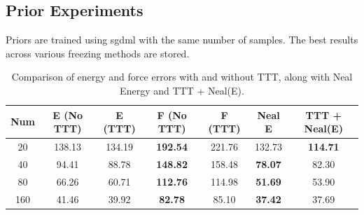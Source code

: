 \documentclass[12pt]{article}
\theoremstyle{definition}
\theoremstyle{remark}
\begin{document}
\subsection{Prior Experiments}
Priors are trained using sgdml with the same number of samples. The best results across various freezing methods are stored.
\begin{table}[ht]
\centering
\small
\setlength{\tabcolsep}{4pt}
\begin{tabular}{c c c c c c c}
\hline
\textbf{Num} & \textbf{E (No TTT)} & \textbf{E (TTT)} & \textbf{F (No TTT)} & \textbf{F (TTT)} & \textbf{Neal E} & \textbf{TTT + Neal(E)} \\
\hline
20  & 138.13 & 134.19 & \textbf{192.54} & 221.76 & 132.73 & \textbf{114.71} \\
40  & 94.41  & 88.78  & \textbf{148.82} & 158.48 & \textbf{78.07}  & 82.30  \\
80  & 66.26  & 60.71  & \textbf{112.76} & 114.98 & \textbf{51.69}  & 53.90  \\
160 & 41.46  & 39.92           & \textbf{82.78}  & 85.10  & \textbf{37.42} & 37.69 \\
\hline
\end{tabular}
\caption{Comparison of energy and force errors with and without TTT, along with Neal Energy and TTT + Neal(E).}
\label{tab:ttt_comparison}
\end{table}
\end{document}
